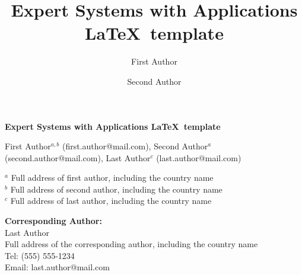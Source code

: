 \documentclass[review]{elsarticle}
\begin{document}
\begin{frontmatter}


\begin{titlepage}
\begin{center}
\vspace*{1cm}

\textbf{ \large Expert Systems with Applications \LaTeX\ template}

\vspace{1.5cm}

First Author$^{a,b}$ (first.author@mail.com), Second Author$^a$ (second.author@mail.com), Last Author$^c$ (last.author@mail.com) \\

\hspace{10pt}

\begin{flushleft}
\small  
$^a$ Full address of first author, including the country name \\
$^b$ Full address of second author, including the country name \\
$^c$ Full address of last author, including the country name

\begin{comment}
Clearly indicate who will handle correspondence at all stages of refereeing and publication, also post-publication. Ensure that phone numbers (with country and area code) are provided in addition to the e-mail address and the complete postal address. Contact details must be kept up to date by the corresponding author.
\end{comment}

\vspace{1cm}
\textbf{Corresponding Author:} \\
Last Author \\
Full address of the corresponding author, including the country name \\
Tel: (555) 555-1234 \\
Email: last.author@mail.com

\end{flushleft}        
\end{center}
\end{titlepage}

\title{Expert Systems with Applications \LaTeX\ template}

\author[label1,label2]{First Author}

\author[label1]{Second Author}


\end{frontmatter}
\end{document}
